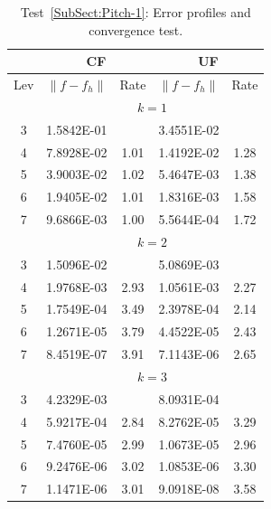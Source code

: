 \documentclass[preprint,11pt]{elsarticle}
\begin{document}
\begin{table}[H]
\caption{Test~\ref{SubSect:Pitch-1}: Error profiles and convergence test.}\label{Tab:Pitch_E-1}
\centering
\begin{tabular}{c|cc|cc}	\hline\hline
& \multicolumn{2}{c|}{CF} &\multicolumn{2}{c}{UF}\\ \hline
Lev & $\|f-f_h\|$ & Rate & $\|f-f_h\|$ & Rate \\ \hline		
&\multicolumn{4}{c}{$k=1$}\\ \hline
3	&1.5842E-01	&	        &3.4551E-02	& \\
4	&7.8928E-02	&1.01	&1.4192E-02	&1.28\\
5	&3.9003E-02	&1.02	&5.4647E-03	&1.38\\
6	&1.9405E-02	&1.01	&1.8316E-03	&1.58\\
7	&9.6866E-03	&1.00	&5.5644E-04	&1.72\\ \hline
			&\multicolumn{4}{c}{$k=2$}\\ \hline	
3	&1.5096E-02	&	&5.0869E-03	& \\
4	&1.9768E-03	&2.93	&1.0561E-03	&2.27\\
5	&1.7549E-04	&3.49	&2.3978E-04	&2.14\\
6	&1.2671E-05	&3.79	&4.4522E-05	&2.43\\
7	&8.4519E-07	&3.91	&7.1143E-06	&2.65\\ \hline
			&\multicolumn{4}{c}{$k=3$}\\ \hline	
3	&4.2329E-03	&	&8.0931E-04	& \\
4	&5.9217E-04	&2.84	&8.2762E-05	&3.29\\ 
5	&7.4760E-05	&2.99	&1.0673E-05	&2.96\\
6	&9.2476E-06	&3.02	&1.0853E-06	&3.30\\ 
7	&1.1471E-06	&3.01	&9.0918E-08	&3.58\\ \hline\hline
\end{tabular}
\end{table}
\end{document}
